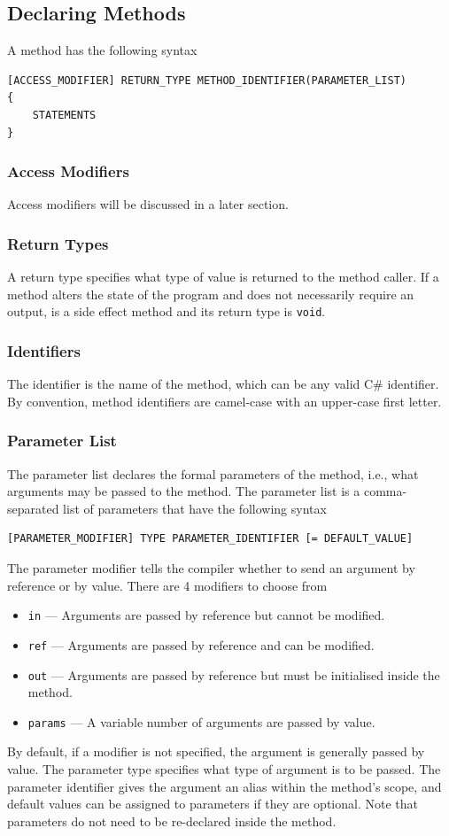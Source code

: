 \documentclass{article}
\begin{document}
\subsection{Declaring Methods}
A method has the following syntax
\begin{verbatim}
[ACCESS_MODIFIER] RETURN_TYPE METHOD_IDENTIFIER(PARAMETER_LIST)
{
    STATEMENTS
}
\end{verbatim}
\subsubsection{Access Modifiers}
Access modifiers will be discussed in a later section.
\subsubsection{Return Types}
A return type specifies what type of value is returned to the method
caller. If a method alters the state of the program and does not
necessarily require an output, is a side effect method and its return
type is \texttt{void}.
\subsubsection{Identifiers}
The identifier is the name of the method, which can be any valid C\#
identifier. By convention, method identifiers are camel-case with an
upper-case first letter.
\subsubsection{Parameter List}
The parameter list declares the formal parameters of the method, i.e.,
what arguments may be passed to the method. The parameter list is a
comma-separated list of parameters that have the following syntax
\begin{verbatim}
[PARAMETER_MODIFIER] TYPE PARAMETER_IDENTIFIER [= DEFAULT_VALUE]
\end{verbatim}
The parameter modifier tells the compiler whether to send an argument
by reference or by value. There are 4 modifiers to choose from
\begin{itemize}
    \item \texttt{in} --- Arguments are passed by reference but cannot be modified.
    \item \texttt{ref} --- Arguments are passed by reference and can be modified.
    \item \texttt{out} --- Arguments are passed by reference but must be initialised inside the method.
    \item \texttt{params} --- A variable number of arguments are passed by value.
\end{itemize}
By default, if a modifier is not specified, the argument is generally passed by value.
The parameter type specifies what type of argument is to be passed. The parameter identifier
gives the argument an alias within the method's scope, and
default values can be assigned to parameters if they are optional.
Note that parameters do not need to be re-declared inside the method.
\end{document}
